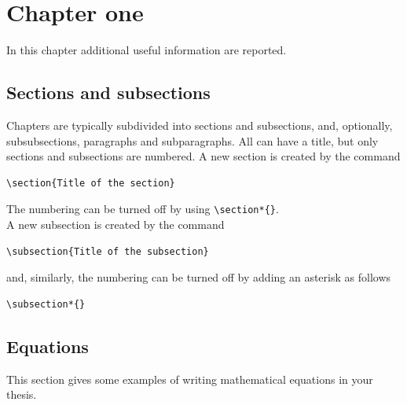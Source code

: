 
\chapter{Chapter one}
\label{ch:chapter_one}%

In this chapter additional useful information are reported.

\section{Sections and subsections}
\label{sec:section_name}
Chapters are typically subdivided into sections and subsections, and, optionally,
subsubsections, paragraphs and subparagraphs.
All can have a title, but only sections and subsections are numbered.
A new section is created by the command
\begin{verbatim}
\section{Title of the section}
\end{verbatim}
The numbering can be turned off by using \verb|\section*{}|.
\\
A new subsection is created by the command
\begin{verbatim}
\subsection{Title of the subsection}
\end{verbatim}
and, similarly, the numbering can be turned off by adding an asterisk as follows 
\begin{verbatim}
\subsection*{}
\end{verbatim}

\section{Equations}
\label{sec:eqs}
This section gives some examples of writing mathematical equations in your thesis.

